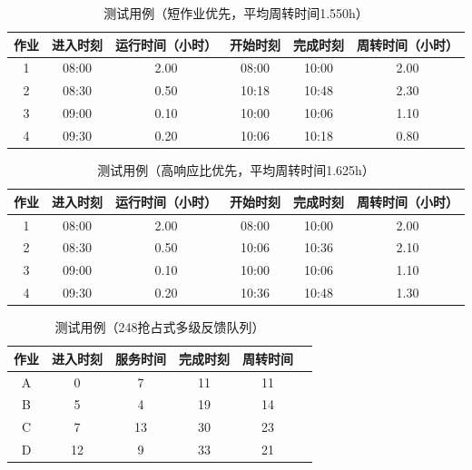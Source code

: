 \documentclass[UTF8]{ctexart}
\begin{document}
\begin{table}[htbp]
    \caption{测试用例（短作业优先，平均周转时间1.550h）}
    \centering
    \begin{tabular}{cccccc}
        \toprule
        作业 & 进入时刻  & 运行时间（小时） & 开始时刻  & 完成时刻  & 周转时间（小时） \\
        \midrule
        1  & 08:00 & 2.00     & 08:00 & 10:00 & 2.00     \\
        2  & 08:30 & 0.50     & 10:18 & 10:48 & 2.30     \\
        3  & 09:00 & 0.10     & 10:00 & 10:06 & 1.10     \\
        4  & 09:30 & 0.20     & 10:06 & 10:18 & 0.80     \\
        \bottomrule
    \end{tabular}
    \qquad
\end{table}

\begin{table}[htbp]
    \caption{测试用例（高响应比优先，平均周转时间1.625h）}
    \centering
    \begin{tabular}{cccccc}
        \toprule
        作业 & 进入时刻  & 运行时间（小时） & 开始时刻  & 完成时刻  & 周转时间（小时） \\
        \midrule
        1  & 08:00 & 2.00     & 08:00 & 10:00 & 2.00     \\
        2  & 08:30 & 0.50     & 10:06 & 10:36 & 2.10     \\
        3  & 09:00 & 0.10     & 10:00 & 10:06 & 1.10     \\
        4  & 09:30 & 0.20     & 10:36 & 10:48 & 1.30     \\
        \bottomrule
    \end{tabular}
    \qquad
\end{table}

\begin{table}[htbp]
    \caption{测试用例（248抢占式多级反馈队列）}
    \centering
    \begin{tabular}{cccccc}
        \toprule
        作业 & 进入时刻 & 服务时间 & 完成时刻 & 周转时间 \\
        \midrule
        A  & 0    & 7    & 11   & 11   \\
        B  & 5    & 4    & 19   & 14   \\
        C  & 7    & 13   & 30   & 23   \\
        D  & 12   & 9    & 33   & 21   \\
        \bottomrule
    \end{tabular}
    \qquad
\end{table}
\end{document}
